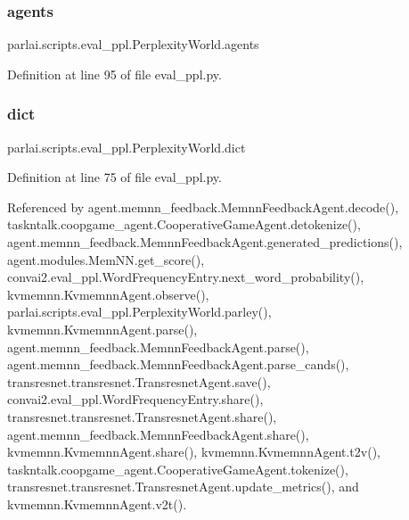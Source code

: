\subsubsection{\texorpdfstring{agents}{agents}}
{\footnotesize\ttfamily parlai.\+scripts.\+eval\+\_\+ppl.\+Perplexity\+World.\+agents}



Definition at line 95 of file eval\+\_\+ppl.\+py.

\mbox{\label{classparlai_1_1scripts_1_1eval__ppl_1_1PerplexityWorld_aef6a413e96d7276e3d39acad0f543a95}} 
\subsubsection{\texorpdfstring{dict}{dict}}
{\footnotesize\ttfamily parlai.\+scripts.\+eval\+\_\+ppl.\+Perplexity\+World.\+dict}



Definition at line 75 of file eval\+\_\+ppl.\+py.



Referenced by agent.\+memnn\+\_\+feedback.\+Memnn\+Feedback\+Agent.\+decode(), taskntalk.\+coopgame\+\_\+agent.\+Cooperative\+Game\+Agent.\+detokenize(), agent.\+memnn\+\_\+feedback.\+Memnn\+Feedback\+Agent.\+generated\+\_\+predictions(), agent.\+modules.\+Mem\+N\+N.\+get\+\_\+score(), convai2.\+eval\+\_\+ppl.\+Word\+Frequency\+Entry.\+next\+\_\+word\+\_\+probability(), kvmemnn.\+Kvmemnn\+Agent.\+observe(), parlai.\+scripts.\+eval\+\_\+ppl.\+Perplexity\+World.\+parley(), kvmemnn.\+Kvmemnn\+Agent.\+parse(), agent.\+memnn\+\_\+feedback.\+Memnn\+Feedback\+Agent.\+parse(), agent.\+memnn\+\_\+feedback.\+Memnn\+Feedback\+Agent.\+parse\+\_\+cands(), transresnet.\+transresnet.\+Transresnet\+Agent.\+save(), convai2.\+eval\+\_\+ppl.\+Word\+Frequency\+Entry.\+share(), transresnet.\+transresnet.\+Transresnet\+Agent.\+share(), agent.\+memnn\+\_\+feedback.\+Memnn\+Feedback\+Agent.\+share(), kvmemnn.\+Kvmemnn\+Agent.\+share(), kvmemnn.\+Kvmemnn\+Agent.\+t2v(), taskntalk.\+coopgame\+\_\+agent.\+Cooperative\+Game\+Agent.\+tokenize(), transresnet.\+transresnet.\+Transresnet\+Agent.\+update\+\_\+metrics(), and kvmemnn.\+Kvmemnn\+Agent.\+v2t().

